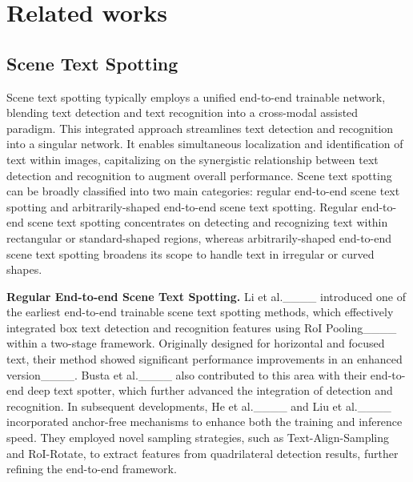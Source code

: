 \section{Related works}
\label{sec:rela}
   

    \subsection{Scene Text Spotting} 
    Scene text spotting typically employs a unified end-to-end trainable network, blending text detection and text recognition into a cross-modal assisted paradigm. This integrated approach streamlines text detection and recognition into a singular network. It enables simultaneous localization and identification of text within images, capitalizing on the synergistic relationship between text detection and recognition to augment overall performance. Scene text spotting can be broadly classified into two main categories: regular end-to-end scene text spotting and arbitrarily-shaped end-to-end scene text spotting. Regular end-to-end scene text spotting concentrates on detecting and recognizing text within rectangular or standard-shaped regions, whereas arbitrarily-shaped end-to-end scene text spotting broadens its scope to handle text in irregular or curved shapes.

    \noindent\textbf{Regular End-to-end Scene Text Spotting.}
    Li et al.____ introduced one of the earliest end-to-end trainable scene text spotting methods, which effectively integrated box text detection and recognition features using RoI Pooling____ within a two-stage framework. Originally designed for horizontal and focused text, their method showed significant performance improvements in an enhanced version____. Busta et al.____ also contributed to this area with their end-to-end deep text spotter, which further advanced the integration of detection and recognition. In subsequent developments, He et al.____ and Liu et al.____ incorporated anchor-free mechanisms to enhance both the training and inference speed. They employed novel sampling strategies, such as Text-Align-Sampling and RoI-Rotate, to extract features from quadrilateral detection results, further refining the end-to-end framework.


